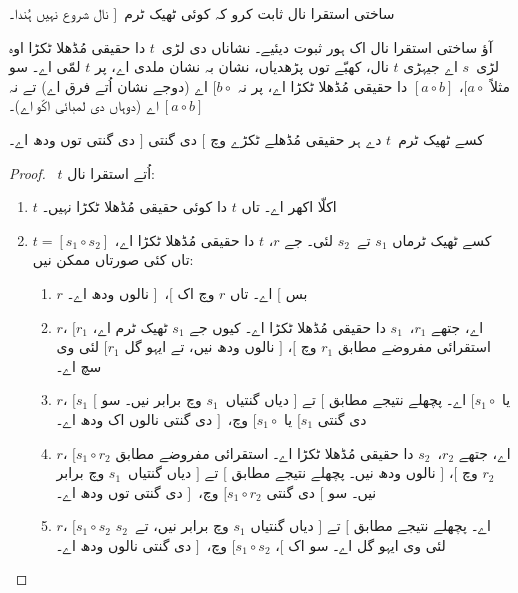 \documentclass[../../../include/open-logic-section]{subfiles}
\begin{document}
\begin{prob}
  ساختی استقرا نال ثابت کرو کہ کوئی ٹھیک ٹرم~$]$ نال شروع نہیں ہُندا۔
\end{prob}

آؤ ساختی استقرا نال اک ہور ثبوت دیئیے۔ نشاناں دی لڑی~$t$ دا حقیقی مُڈھلا ٹکڑا اوہ لڑی~$s$ اے جیہڑی $t$ نال، کھبّے توں پڑھدیاں، نشان بہ نشان ملدی اے، پر $t$ لمّی اے۔ سو مثلاً $[a \circ {}$، $[a \circ b]$ دا حقیقی مُڈھلا ٹکڑا اے، پر نہ $[b \circ {}$ اے (دوجے نشان اُتے فرق اے) تے نہ $[a
\circ b]$ اے (دوہاں دی لمبائی اکّو اے)۔

\begin{prop}
  کسے ٹھیک ٹرم~$t$ دے ہر حقیقی مُڈھلے ٹکڑے وچ $[$ دی گنتی $]$ دی گنتی توں ودھ اے۔
\end{prop}

\begin{proof}
  ~$t$ اُتے استقرا نال:
  \begin{enumerate}
  \item $t$ اکلّا اکھر اے۔ تاں $t$ دا کوئی حقیقی مُڈھلا ٹکڑا نہیں۔
  \item $t = [s_1 \circ s_2]$ کسے ٹھیک ٹرماں $s_1$ تے~$s_2$ لئی۔ جے $r$، $t$ دا حقیقی مُڈھلا ٹکڑا اے، تاں کئی صورتاں ممکن نیں:
    \begin{enumerate}
    \item $r$ بس $[$ اے۔ تاں $r$ وچ اک $[$،~$]$ نالوں ودھ اے۔
    \item $r$، $[r_1$ اے، جتھے $r_1$،~$s_1$ دا حقیقی مُڈھلا ٹکڑا اے۔ کیوں جے $s_1$ ٹھیک ٹرم اے، استقرائی مفروضے مطابق $r_1$ وچ $[$، $]$ نالوں ودھ نیں، تے ایہو گل $[r_1$ لئی وی سچ اے۔
    \item $r$، $[s_1$ یا $[s_1 \circ {}$ اے۔ پچھلے نتیجے مطابق $[$ تے $]$ دیاں گنتیاں~$s_1$ وچ برابر نیں۔ سو $[$ دی گنتی $[s_1$ یا $[s_1 \circ {}$ وچ،~$]$ دی گنتی نالوں اک ودھ اے۔
    \item $r$، $[s_1 \circ r_2$ اے، جتھے $r_2$،~$s_2$ دا حقیقی مُڈھلا ٹکڑا اے۔ استقرائی مفروضے مطابق $r_2$ وچ $[$، $]$ نالوں ودھ نیں۔ پچھلے نتیجے مطابق $[$ تے $]$ دیاں گنتیاں~$s_1$ وچ برابر نیں۔ سو $[$ دی گنتی $[s_1 \circ r_2$ وچ،~$]$ دی گنتی توں ودھ اے۔
    \item $r$، $[s_1 \circ s_2$ اے۔ پچھلے نتیجے مطابق $[$ تے $]$ دیاں گنتیاں $s_1$ وچ برابر نیں، تے~$s_2$ لئی وی ایہو گل اے۔ سو اک $[$، $[s_1 \circ s_2$ وچ،~$]$ دی گنتی نالوں ودھ اے۔
    \end{enumerate}
  \end{enumerate}
\end{proof}
\end{document}
